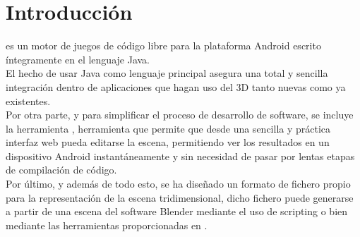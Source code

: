 
\chapter{Introducci\'on} %

\label{Chapter1} %



\robotto es un motor de juegos de código libre para la plataforma Android escrito íntegramente en el lenguaje Java.\\
El hecho de usar Java como lenguaje principal asegura una total y sencilla integración dentro de aplicaciones que hagan uso del 3D tanto nuevas como ya existentes.\\
Por otra parte, y para simplificar el proceso de desarrollo de software, se incluye la herramienta \studio, herramienta que permite que desde una sencilla y práctica interfaz web pueda editarse la escena, permitiendo ver los resultados en un dispositivo Android instantáneamente y sin necesidad de pasar por lentas etapas de compilación de código.\\
Por último, y además de todo esto, se ha diseñado un formato de fichero propio para la representación de la escena tridimensional, dicho fichero puede generarse a partir de una escena del software Blender mediante el uso de scripting o bien mediante las herramientas proporcionadas en \studio.\\



